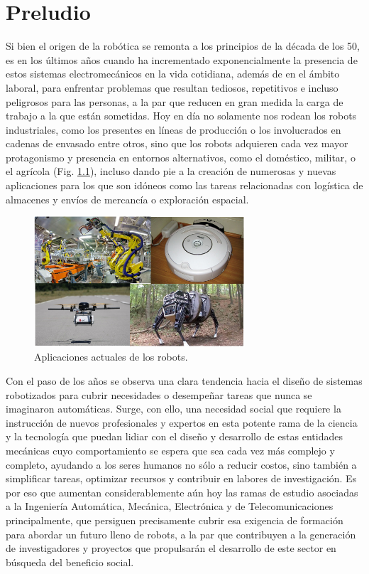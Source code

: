\chapter{Preludio}

Si bien el origen de la robótica se remonta a los principios de la década de los 50, es en los últimos años cuando ha incrementado exponencialmente la presencia de estos sistemas electromecánicos en la vida cotidiana, además de en el ámbito laboral, para enfrentar problemas que resultan tediosos, repetitivos e incluso peligrosos para las personas, a la par que reducen en gran medida la carga de trabajo a la que están sometidas. Hoy en día no solamente nos rodean los robots industriales, como los presentes en líneas de producción o los involucrados en cadenas de envasado entre otros, sino que los robots adquieren cada vez mayor protagonismo y presencia en entornos alternativos, como el doméstico, militar, o el agrícola (Fig. \ref{robots}), incluso dando pie a la creación de numerosas y nuevas aplicaciones para los que son idóneos como las tareas relacionadas con logística de almacenes y envíos de mercancía o exploración espacial.

\begin{figure}[!hbtp]  \centering\noindent
    \includegraphics[width=0.7\textwidth]{figures/robots.png}
    \caption{Aplicaciones actuales de los robots.}
    \label{robots}
\end{figure}

Con el paso de los años se observa una clara tendencia hacia el diseño de sistemas robotizados para cubrir necesidades o desempeñar tareas que nunca se imaginaron automáticas. Surge, con ello, una necesidad social que requiere la instrucción de nuevos profesionales y expertos en esta potente rama de la ciencia y la tecnología que puedan lidiar con el diseño y desarrollo de estas entidades mecánicas cuyo comportamiento se espera que sea cada vez más complejo y completo, ayudando a los seres humanos no sólo a reducir costos, sino también a simplificar tareas, optimizar recursos y contribuir en labores de investigación. Es por eso que aumentan considerablemente aún hoy las ramas de estudio asociadas a la Ingeniería Automática, Mecánica, Electrónica y de Telecomunicaciones principalmente, que persiguen precisamente cubrir esa exigencia de formación para abordar un futuro lleno de robots, a la par que contribuyen a la generación de investigadores y proyectos que propulsarán el desarrollo de este sector en búsqueda del beneficio social. 

